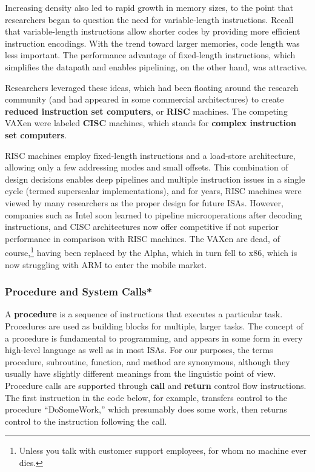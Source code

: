 Increasing density also led to rapid growth in memory sizes, to the
point that researchers began to question the need for variable-length
instructions.  Recall that variable-length instructions allow shorter
codes by providing more efficient instruction encodings.  With the
trend toward larger memories, code length was less important.  The
performance advantage of fixed-length instructions, which simplifies
the datapath and enables pipelining, on the other hand, was 
attractive.

Researchers leveraged these ideas, which had been floating around the
research community (and had appeared in some commercial architectures)
to create {\bf reduced instruction set computers}, or {\bf RISC}
machines.  The competing VAXen were labeled {\bf CISC} machines, which
stands for {\bf complex instruction set computers}.

RISC machines employ fixed-length instructions and a load-store
architecture, allowing only a few addressing modes and small offsets.
This combination of design decisions enables deep pipelines and
multiple instruction issues in a single cycle (termed superscalar
implementations), and for years, RISC machines were viewed by many
researchers as the proper design for future ISAs.  However, companies
such as Intel soon learned to pipeline microoperations after decoding
instructions, and CISC architectures now offer competitive if not
superior performance in comparison with RISC machines.  The VAXen are
dead, of course,\footnote{Unless you talk with customer support
employees, for whom no machine ever dies.}  having been replaced by
the Alpha, which in turn fell to x86, which is now struggling with ARM
to enter the mobile market.  \\


\subsubsection{Procedure and System Calls*}

A {\bf procedure} is a sequence of instructions that executes a
particular task.  Procedures are used as building blocks for multiple,
larger tasks.  The concept of a procedure is fundamental to
programming, and appears in some form in every high-level language as
well as in most ISAs.
%
For our purposes, the terms procedure, subroutine,
function, and method are synonymous, although they usually have
slightly different meanings from the linguistic point of view.
Procedure calls are supported through {\bf call} and {\bf return}
control flow instructions.  The first instruction in the code below,
for example, transfers control to the procedure ``DoSomeWork,'' which
presumably does some work, then returns control to the instruction
following the call.


